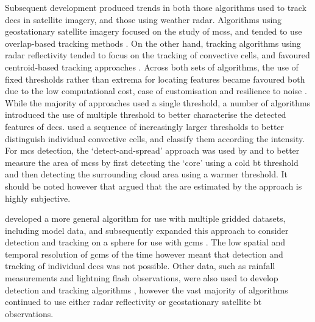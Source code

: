 Subsequent development produced trends in both those algorithms used to track \acrshort{dcc}s in satellite imagery, and those using weather radar.
Algorithms using geostationary satellite imagery focused on the study of \acrshort{mcs}s, and tended to use overlap-based tracking methods \citep{arnaud_automatic_1992, evans_procedure_1996, carvalho_satellite_2001, morel_climatology_2002}.
On the other hand, tracking algorithms using radar reflectivity tended to focus on the tracking of convective cells, and favoured centroid-based tracking approaches \citep{dixon_titan_1993, johnson_storm_1998, handwerker_cell_2002}.
Across both sets of algorithms, the use of fixed thresholds rather than extrema for locating features became favoured both due to the low computational cost, ease of customisation and resilience to noise \citep{augustine_mesoscale_1988}.
While the majority of approaches used a single threshold, a number of algorithms introduced the use of multiple threshold to better characterise the detected features of \acrshort{dcc}s.
\citet{johnson_storm_1998} used a sequence of increasingly larger thresholds to better distinguish individual convective cells, and classify them according the intensity.
For \acrshort{mcs} detection, the `detect-and-spread' approach was used by \citet{evans_procedure_1996} and \citet{boer_lagrangian_1997} to better measure the area of \acrshort{mcs}s by first detecting the `core' using a cold \acrshort{bt} threshold and then detecting the surrounding cloud area using a warmer threshold.
It should be noted however that \citet{augustine_mesoscale_1988} argued that the are estimated by the approach is highly subjective.

\citet{hodges_general_1994} developed a more general algorithm for use with multiple gridded datasets, including model data, and subsequently expanded this approach to consider detection and tracking on a sphere for use with \acrshort{gcm}s \citep{hodges_feature_1995}.
The low spatial and temporal resolution of \acrshort{gcm}s of the time however meant that detection and tracking of individual \acrshort{dcc}s was not possible.
Other data, such as rainfall measurements and lightning flash observations, were also used to develop detection and tracking algorithms \citep{steinacker_automatic_2000}, however the vast majority of algorithms continued to use either radar reflectivity or geostationary satellite \acrshort{bt} observations.

